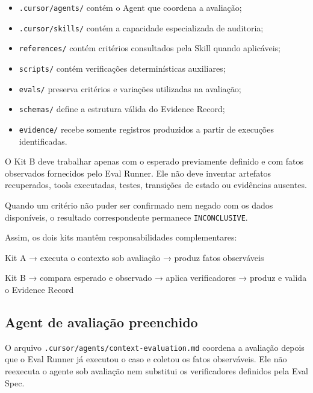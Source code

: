 \documentclass[
  10pt,
  a4paper,
  oneside]{book}
\newenvironment{Shaded}{}{}
\newcommand{\NormalTok}[1]{#1}
\providecommand{\tightlist}{%
  \setlength{\itemsep}{0pt}\setlength{\parskip}{0pt}}
\renewenvironment{Shaded}{\begin{snugshade}}{\end{snugshade}}%
\begin{document}
\begin{itemize}
\tightlist
\item
  \texttt{.cursor/agents/} contém o Agent que coordena a avaliação;
\item
  \texttt{.cursor/skills/} contém a capacidade especializada de
  auditoria;
\item
  \texttt{references/} contém critérios consultados pela Skill quando
  aplicáveis;
\item
  \texttt{scripts/} contém verificações determinísticas auxiliares;
\item
  \texttt{evals/} preserva critérios e variações utilizadas na
  avaliação;
\item
  \texttt{schemas/} define a estrutura válida do Evidence Record;
\item
  \texttt{evidence/} recebe somente registros produzidos a partir de
  execuções identificadas.
\end{itemize}

O Kit B deve trabalhar apenas com o esperado previamente definido e com
fatos observados fornecidos pelo Eval Runner. Ele não deve inventar
artefatos recuperados, tools executadas, testes, transições de estado ou
evidências ausentes.

Quando um critério não puder ser confirmado nem negado com os dados
disponíveis, o resultado correspondente permanece \texttt{INCONCLUSIVE}.

Assim, os dois kits mantêm responsabilidades complementares:

\begin{Shaded}
\begin{Highlighting}[]
\NormalTok{Kit A}
\NormalTok{→ executa o contexto sob avaliação}
\NormalTok{→ produz fatos observáveis}

\NormalTok{Kit B}
\NormalTok{→ compara esperado e observado}
\NormalTok{→ aplica verificadores}
\NormalTok{→ produz e valida o Evidence Record}
\end{Highlighting}
\end{Shaded}

\hypertarget{agent-de-avaliauxe7uxe3o-preenchido}{%
\subsection{Agent de avaliação
preenchido}\label{agent-de-avaliauxe7uxe3o-preenchido}}

O arquivo \texttt{.cursor/agents/context-evaluation.md} coordena a
avaliação depois que o Eval Runner já executou o caso e coletou os fatos
observáveis. Ele não reexecuta o agente sob avaliação nem substitui os
verificadores definidos pela Eval Spec.
\end{document}
